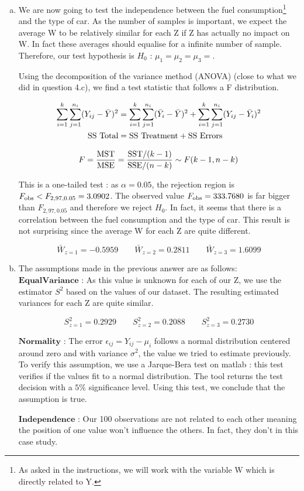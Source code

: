 \documentclass[a4paper]{article}
\begin{document}
\begin{enumerate}[(a)]
\item We are now going to test the independence between the fuel consumption\footnote{As asked in the instructions, we will work with the variable W which is directly related to Y.} and the type of car. As the number of samples is important, we expect the average W to be relatively similar for each Z if Z has actually no impact on W. In fact these averages should equalise for a infinite number of sample. Therefore, our test hypothesis is $H_0$ : $ \mu_1= \mu_2 = \mu_3=$.

Using the decomposition of the variance method (ANOVA) (close to what we did in question 4.c), we find a test statistic that follows a F distribution.

\nonumber
\begin{equation} \label{eq3}
\begin{split}
\sum_{i=1}^k \sum_{j=1}^{n_i} (Y_{ij}-\bar{Y})^2 & =  \sum_{i=1}^k \sum_{j=1}^{n_i}(\bar{Y}_{i}-\bar{Y})^2 + \sum_{i=1}^k \sum_{j=1}^{n_i} (Y_{ij}-\bar{Y}_i)^2\\
 \textup{SS Total} & = \textup{SS Treatment} + \textup{SS Errors}
\end{split}
\end{equation}


$$F = \frac{\textup{MST}}{\textup{MSE}} = \frac{\textup{SST}/(k-1)}{\textup{SSE}/(n-k)} \sim F(k-1,n-k)$$

This is a one-tailed test : as $\alpha  = 0.05$, the rejection region is $F_{\textup{obs}} < F_{2,97,0.05} = 3.0902$. The observed value $F_{\textup{obs}}=333.7680$  is far bigger than $F_{2,97,0.05}$ and therefore we reject $H_0$. In fact, it seems that there is a correlation between the fuel consumption and the type of car. This result is not surprising since the average W for each Z are quite different.

$$\bar{W}_{z=1} = -0.5959 \qquad \bar{W}_{z=2} = 0.2811 \qquad \bar{W}_{z=3} = 1.6099$$


\item The assumptions made in the previous answer are as follows:
\\
$\mathbf{Equal} \mathbf{Variance}$ : As this value is unknown for each of our Z, we use the estimator $S^2$ based on the values of our dataset. The resulting estimated variances for each Z are quite similar.

$$S^2_{z=1} = 0.2929 \qquad S^2_{z=2} = 0.2088 \qquad S^2_{z=3}  = 0.2730$$

$\mathbf{Normality}$ : The error $\epsilon_{ij} = Y_{ij} - \mu_i$ follows a normal distribution centered around zero and with variance $\sigma^2$, the value we tried to estimate previously. To verify this assumption, we use a Jarque-Bera test on matlab : this test verifies if the values fit to a normal distribution. The tool returns the test decision with a $5\%$ significance level. Using this test, we conclude that the assumption is true.

$\mathbf{Independence}$ : Our 100 observations are not related to each other meaning the position of one value won't influence the others. In fact, they don't in this case study.

\end{enumerate}
\end{document}
